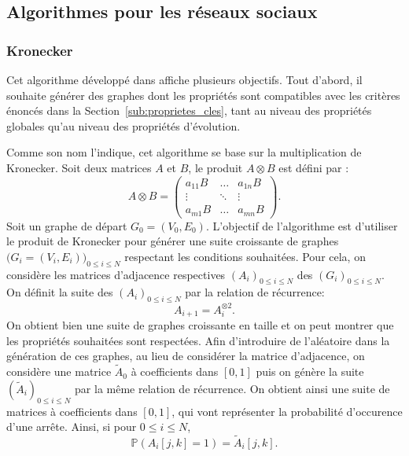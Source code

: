 \documentclass[a4paper]{article}
\begin{document}
    \subsection{Algorithmes pour les réseaux sociaux}
    \label{sub:algorithmes_reseaux_sociaux}
    \subsubsection{Kronecker}
    Cet algorithme développé dans \cite{leskovec2005realistic} affiche
    plusieurs objectifs. Tout d'abord, il souhaite générer des graphes
    dont les propriétés sont compatibles avec les critères énoncés dans
    la Section~\ref{sub:proprietes_cles}, tant au niveau des propriétés
    globales qu'au niveau des propriétés d'évolution.

    Comme son nom l'indique, cet algorithme se base sur la multiplication
    de Kronecker. Soit deux matrices $A$ et $B$, le produit $A \otimes B$ est
    défini par :
    \[
        A \otimes B =
        \begin{pmatrix}
            a_{11}B & \ldots & a_{1n}B \\
            \vdots & \ddots & \vdots \\
            a_{m1}B & \ldots & a_{mn}B
        \end{pmatrix}.
    \]
    Soit un graphe de départ $G_0 = (V_0, E_0)$. L'objectif de l'algorithme est
    d'utiliser le produit de Kronecker pour générer une suite croissante de
    graphes $\big(G_i = (V_i, E_i)\big)_{0 \leq i \leq N}$ respectant les
    conditions souhaitées. Pour cela, on considère les matrices d'adjacence
    respectives $(A_i)_{0 \leq i \leq N}$ des $(G_i)_{0 \leq i \leq N}$. On
    définit la suite des $(A_i)_{0 \leq i \leq N}$ par la relation de
    récurrence:
    \[
        A_{i+1} = A_i^{\otimes 2}.
    \]
    On obtient bien une suite de graphes croissante en taille et on peut
    montrer que les propriétés souhaitées sont respectées. Afin d'introduire
    de l'aléatoire dans la génération de ces graphes, au lieu de considérer la
    matrice d'adjacence, on considère une matrice $\tilde{A}_0$ à coefficients
    dans $[0, 1]$ puis on génère la suite $\left( \tilde{A}_i \right)_{0 \leq i \leq N}$
    par la même relation de récurrence. On obtient ainsi une suite de matrices
    à coefficients dans $[0, 1]$, qui vont représenter la probabilité
    d'occurence d'une arrête. Ainsi, si pour $0 \leq i \leq N$,
    \[
        \mathbb{P}\left( A_i[j,k] = 1 \right) = \tilde{A}_i[j, k].
    \]
\end{document}
